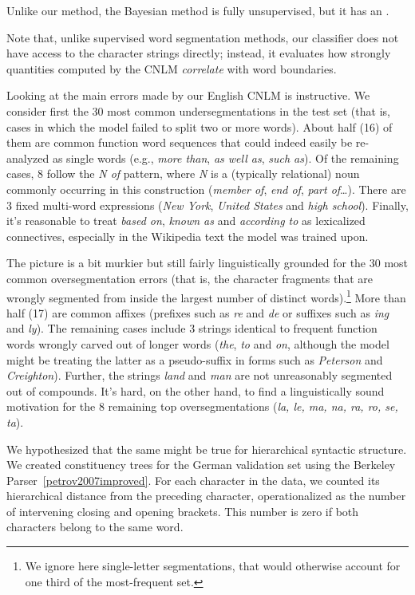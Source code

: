 Unlike our method, the Bayesian method is fully unsupervised, but it has an .

Note that, unlike supervised word segmentation methods, our classifier does not have access to the character strings directly; instead, it evaluates how strongly quantities computed by the CNLM \emph{correlate} with word boundaries.



Looking at the main errors made by our English CNLM is instructive. We
consider first the 30 most common undersegmentations in the test set
(that is, cases in which the model failed to split two or more
words). About half (16) of them are common function word sequences
that could indeed easily be re-analyzed as single words (e.g.,
\emph{more than}, \emph{as well as}, \emph{such as}). Of the remaining
cases, 8 follow the \emph{N of} pattern, where \emph{N} is a
(typically relational) noun commonly occurring in this construction
(\emph{member of}, \emph{end of}, \emph{part of}\ldots). There are 3
fixed multi-word expressions (\emph{New York}, \emph{United States}
and \emph{high school}). Finally, it's reasonable to treat \emph{based
  on}, \emph{known as} and \emph{according to} as lexicalized
connectives, especially in the Wikipedia text the model was trained
upon.

The picture is a bit murkier but still fairly linguistically grounded
for the 30 most common oversegmentation errors (that is, the character
fragments that are wrongly segmented from inside the largest number of
distinct words).\footnote{We ignore here single-letter segmentations,
  that would otherwise account for one third of the most-frequent
  set.}  More than half (17) are common affixes (prefixes such as
\emph{re} and \emph{de} or suffixes such as \emph{ing} and
\emph{ly}). The remaining cases include 3 strings identical to frequent
function words wrongly carved out of longer words (\emph{the},
\emph{to} and \emph{on}, although the model might be treating the
latter as a pseudo-suffix in forms such as \emph{Peterson} and
\emph{Creighton}). Further, the strings \emph{land} and \emph{man} are not
unreasonably segmented out of compounds. It's hard, on the other hand,
to find a linguistically sound motivation for the 8 remaining top
oversegmentations (\emph{la, le, ma, na, ra, ro, se, ta}).


We hypothesized that the same might be true for hierarchical syntactic structure.
We created constituency trees for the German validation set using the Berkeley Parser~\ref{petrov2007improved}.
For each character in the data, we counted its hierarchical distance from the preceding character, operationalized as the number of intervening closing and opening brackets.
This number is zero if both characters belong to the same word.

